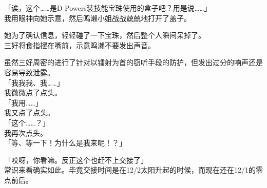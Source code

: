「诶，这个……是D Powers装技能宝珠使用的盒子吧？用是说……」\\

我用眼神向她示意，然后鸣濑小姐战战兢兢地打开了盖子。

她为了确认信息，轻轻碰了一下宝珠，然后整个人瞬间呆掉了。\\

三好将食指摆在嘴前，示意鸣濑不要发出声音。

虽然三好周密的进行了针对以镭射为首的窃听手段的防护，但发出过分的响声还是容易导致泄露。\\

「我我我、我……」\\

我微微点了点头。\\

「我用……」\\

我又点了点头。\\

「这个……？」\\

我再次点头。\\

「等、等一下！为什么是我来呢！？」

「哎呀，你看嘛。反正这个也赶不上交接了」\\

常识来看确实如此。毕竟交接时间是在12/2太阳升起的时候，而现在还在12/1的零点前后。\\

